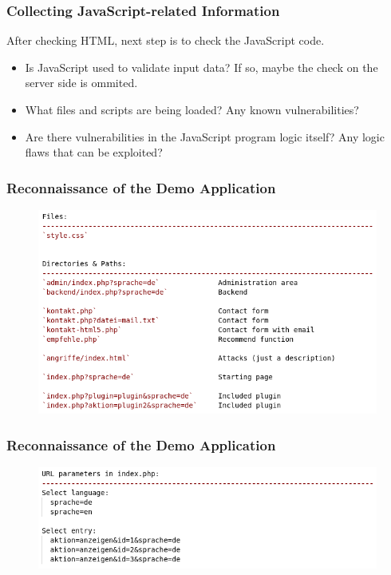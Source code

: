 \documentclass[aspectratio=169]{beamer}
\begin{document}
\begin{frame}
    \frametitle{Collecting JavaScript-related Information}
    After checking HTML, next step is to check the JavaScript code.
    \vfill
    \begin{itemize}
        \item Is JavaScript used to validate input data? If so, maybe the check on the server side is ommited. 
        \item What files and scripts are being loaded? Any known vulnerabilities?
        \item Are there vulnerabilities in the JavaScript program logic itself? Any logic flaws that can be exploited?
    \end{itemize}   
\end{frame}


\begin{frame}
    \frametitle{Reconnaissance of the Demo Application}
    \begin{figure}
        \centering
        \includegraphics[scale=.4]{img/01-recon/recon-files-directories-paths.png}        
    \end{figure}
\end{frame}

\begin{frame}
    \frametitle{Reconnaissance of the Demo Application}
    \begin{figure}
        \centering
        \includegraphics[scale=.4]{img/01-recon/recon-url-parameters.png}        
    \end{figure}
\end{frame}
\end{document}
